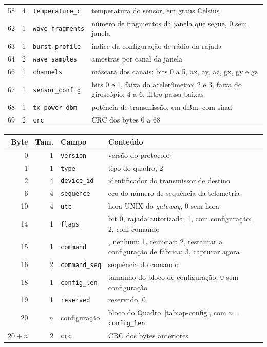 \begin{quadro}[!htbp]
\begin{tabular}{@{}rr>{\raggedright\arraybackslash}p{38mm}>{\raggedright\arraybackslash}p{78mm}@{}}
58 & 4 & \texttt{temperature\_c} & temperatura do sensor, em graus Celsius \\
62 & 1 & \texttt{wave\_fragments} & número de fragmentos da janela que segue, 0 sem janela \\
63 & 1 & \texttt{burst\_profile} & índice da configuração de rádio da rajada \\
64 & 2 & \texttt{wave\_samples} & amostras por canal da janela \\
66 & 1 & \texttt{channels} & máscara dos canais: bits 0 a 5, ax, ay, az, gx, gy e gz \\
67 & 1 & \texttt{sensor\_config} & bits 0 e 1, faixa do acelerômetro; 2 e 3, faixa do giroscópio; 4 a 6, filtro passa-baixas \\
68 & 1 & \texttt{tx\_power\_dbm} & potência de transmissão, em dBm, com sinal \\
69 & 2 & \texttt{crc} & CRC dos bytes 0 a 68 \\
\bottomrule
\end{tabular}
\end{quadro}

\begin{quadro}[!htbp]
\centering\small
\caption{Campos da resposta do \textit{gateway}}\label{tab:ap-resposta}
\begin{tabular}{@{}rr>{\raggedright\arraybackslash}p{38mm}>{\raggedright\arraybackslash}p{78mm}@{}}
\toprule
Byte & Tam. & Campo & Conteúdo \\
\midrule
0 & 1 & \texttt{version} & versão do protocolo \\
1 & 1 & \texttt{type} & tipo do quadro, 2 \\
2 & 4 & \texttt{device\_id} & identificador do transmissor de destino \\
6 & 4 & \texttt{sequence} & eco do número de sequência da telemetria \\
10 & 4 & \texttt{utc} & hora UNIX do \textit{gateway}, 0 sem hora \\
14 & 1 & \texttt{flags} & bit 0, rajada autorizada; 1, com configuração; 2, com comando \\
15 & 1 & \texttt{command} & 0, nenhum; 1, reiniciar; 2, restaurar a configuração de fábrica; 3, capturar agora \\
16 & 2 & \texttt{command\_seq} & sequência do comando \\
18 & 1 & \texttt{config\_len} & tamanho do bloco de configuração, 0 sem configuração \\
19 & 1 & \texttt{reserved} & reservado, 0 \\
20 & $n$ & configuração & bloco do Quadro~\ref{tab:ap-config}, com $n$ = \texttt{config\_len} \\
$20+n$ & 2 & \texttt{crc} & CRC dos bytes anteriores \\
\bottomrule
\end{tabular}
\end{quadro}

